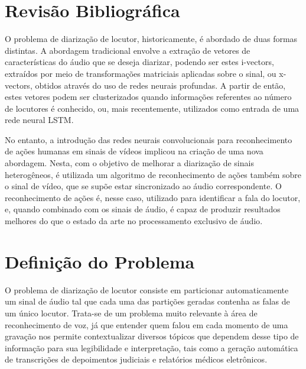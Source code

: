 \section{Revisão Bibliográfica}
\label{sec:related-work}

O problema de diarização de locutor, historicamente, é abordado de duas formas distintas.
A abordagem tradicional envolve a extração de vetores de características do áudio que se deseja diarizar, podendo ser estes i-vectors\cite{dehakFrontEndFactorAnalysis2011}, extraídos por meio de transformações matriciais aplicadas sobre o sinal, ou x-vectors\cite{snyderXVectorsRobustDNN2018}, obtidos através do uso de redes neurais profundas.
A partir de então, estes vetores podem ser clusterizados\cite{sellSpeakerDiarizationPlda2014} quando informações referentes ao número de locutores é conhecido, ou, mais recentemente, utilizados como entrada de uma rede neural LSTM\cite{wangSpeakerDiarizationLSTM2018}.

No entanto, a introdução das redes neurais convolucionais para reconhecimento de ações humanas em sinais de vídeos\cite{ji3DConvolutionalNeural2013, karpathyLargeScaleVideoClassification2014} implicou na criação de uma nova abordagem.
Nesta, com o objetivo de melhorar a diarização de sinais heterogêneos, é utilizada um algoritmo de reconhecimento de ações também sobre o sinal de vídeo\cite{hersheyAudiovisualGraphicalModels2004}, que se supõe estar sincronizado ao áudio correspondente.
O reconhecimento de ações é, nesse caso, utilizado para identificar a fala do locutor, e, quando combinado com os sinais de áudio, é capaz de produzir resultados melhores do que o estado da arte no processamento exclusivo de áudio\cite{ephratLookingListenCocktail2018}.

\section{Definição do Problema}
\label{sec:problem-desc}

O problema de diarização de locutor consiste em particionar automaticamente um sinal de áudio tal que cada uma das partições geradas contenha as falas de um único locutor.
Trata-se de um problema muito relevante à área de reconhecimento de voz, já que entender quem falou em cada momento de uma gravação nos permite contextualizar diversos tópicos que dependem desse tipo de informação para sua legibilidade e interpretação, tais como a geração automática de transcrições de depoimentos judiciais e relatórios médicos eletrônicos.

